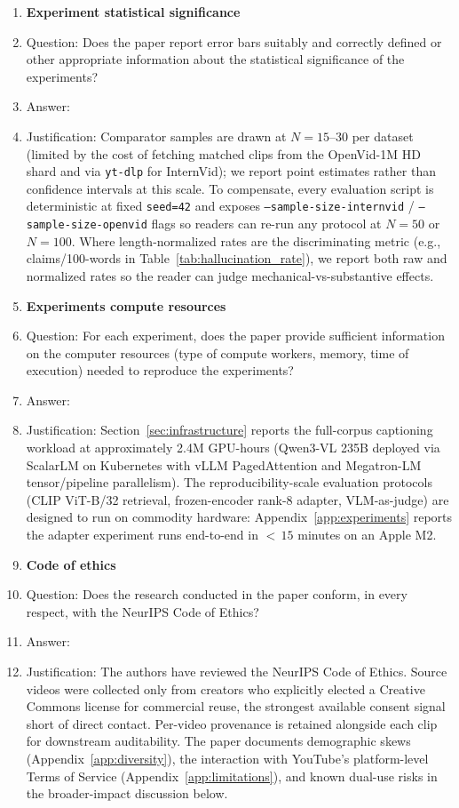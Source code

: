 \begin{enumerate}
\item {\bf Experiment statistical significance}
    \item[] Question: Does the paper report error bars suitably and correctly defined or other appropriate information about the statistical significance of the experiments?
    \item[] Answer: \answerNo{}
    \item[] Justification: Comparator samples are drawn at $N=15$--$30$ per dataset (limited by the cost of fetching matched clips from the OpenVid-1M HD shard and via \texttt{yt-dlp} for InternVid); we report point estimates rather than confidence intervals at this scale. To compensate, every evaluation script is deterministic at fixed \texttt{seed=42} and exposes \texttt{--sample-size-internvid} / \texttt{--sample-size-openvid} flags so readers can re-run any protocol at $N=50$ or $N=100$. Where length-normalized rates are the discriminating metric (e.g., claims/100-words in Table~\ref{tab:hallucination_rate}), we report both raw and normalized rates so the reader can judge mechanical-vs-substantive effects.

\item {\bf Experiments compute resources}
    \item[] Question: For each experiment, does the paper provide sufficient information on the computer resources (type of compute workers, memory, time of execution) needed to reproduce the experiments?
    \item[] Answer: \answerYes{}
    \item[] Justification: Section~\ref{sec:infrastructure} reports the full-corpus captioning workload at approximately 2.4M GPU-hours (Qwen3-VL 235B deployed via ScalarLM on Kubernetes with vLLM PagedAttention and Megatron-LM tensor/pipeline parallelism). The reproducibility-scale evaluation protocols (CLIP ViT-B/32 retrieval, frozen-encoder rank-8 adapter, VLM-as-judge) are designed to run on commodity hardware: Appendix~\ref{app:experiments} reports the adapter experiment runs end-to-end in $<\,15$ minutes on an Apple M2.

\item {\bf Code of ethics}
    \item[] Question: Does the research conducted in the paper conform, in every respect, with the NeurIPS Code of Ethics?
    \item[] Answer: \answerYes{}
    \item[] Justification: The authors have reviewed the NeurIPS Code of Ethics. Source videos were collected only from creators who explicitly elected a Creative Commons license for commercial reuse, the strongest available consent signal short of direct contact. Per-video provenance is retained alongside each clip for downstream auditability. The paper documents demographic skews (Appendix~\ref{app:diversity}), the interaction with YouTube's platform-level Terms of Service (Appendix~\ref{app:limitations}), and known dual-use risks in the broader-impact discussion below.


\end{enumerate}
